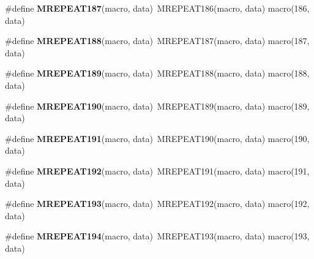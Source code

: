 \begin{DoxyCompactItemize}
\item 
\hypertarget{group__group__xmega__utils__mrepeat_ga694587833aed28be3a88e364ef3adbd3}{\#define {\bfseries M\-R\-E\-P\-E\-A\-T187}(macro, data)~M\-R\-E\-P\-E\-A\-T186(macro, data)   macro(186, data)}\label{group__group__xmega__utils__mrepeat_ga694587833aed28be3a88e364ef3adbd3}

\item 
\hypertarget{group__group__xmega__utils__mrepeat_ga58e111ce05110cc0fe761789c2ec761a}{\#define {\bfseries M\-R\-E\-P\-E\-A\-T188}(macro, data)~M\-R\-E\-P\-E\-A\-T187(macro, data)   macro(187, data)}\label{group__group__xmega__utils__mrepeat_ga58e111ce05110cc0fe761789c2ec761a}

\item 
\hypertarget{group__group__xmega__utils__mrepeat_ga691dc645795e6f5cb2083e198a7af972}{\#define {\bfseries M\-R\-E\-P\-E\-A\-T189}(macro, data)~M\-R\-E\-P\-E\-A\-T188(macro, data)   macro(188, data)}\label{group__group__xmega__utils__mrepeat_ga691dc645795e6f5cb2083e198a7af972}

\item 
\hypertarget{group__group__xmega__utils__mrepeat_ga90b2ca3e144e35ea7d3f1f757868cbab}{\#define {\bfseries M\-R\-E\-P\-E\-A\-T190}(macro, data)~M\-R\-E\-P\-E\-A\-T189(macro, data)   macro(189, data)}\label{group__group__xmega__utils__mrepeat_ga90b2ca3e144e35ea7d3f1f757868cbab}

\item 
\hypertarget{group__group__xmega__utils__mrepeat_ga8914eac2b15fba3933b8bd800427a153}{\#define {\bfseries M\-R\-E\-P\-E\-A\-T191}(macro, data)~M\-R\-E\-P\-E\-A\-T190(macro, data)   macro(190, data)}\label{group__group__xmega__utils__mrepeat_ga8914eac2b15fba3933b8bd800427a153}

\item 
\hypertarget{group__group__xmega__utils__mrepeat_ga409d357004e39610efaaad55f3325484}{\#define {\bfseries M\-R\-E\-P\-E\-A\-T192}(macro, data)~M\-R\-E\-P\-E\-A\-T191(macro, data)   macro(191, data)}\label{group__group__xmega__utils__mrepeat_ga409d357004e39610efaaad55f3325484}

\item 
\hypertarget{group__group__xmega__utils__mrepeat_ga44cace8e364132f4472cb81dabb2e525}{\#define {\bfseries M\-R\-E\-P\-E\-A\-T193}(macro, data)~M\-R\-E\-P\-E\-A\-T192(macro, data)   macro(192, data)}\label{group__group__xmega__utils__mrepeat_ga44cace8e364132f4472cb81dabb2e525}

\item 
\hypertarget{group__group__xmega__utils__mrepeat_gad99185ad8f1a4a6a5597cf80d2ef1453}{\#define {\bfseries M\-R\-E\-P\-E\-A\-T194}(macro, data)~M\-R\-E\-P\-E\-A\-T193(macro, data)   macro(193, data)}\label{group__group__xmega__utils__mrepeat_gad99185ad8f1a4a6a5597cf80d2ef1453}


\end{DoxyCompactItemize}
